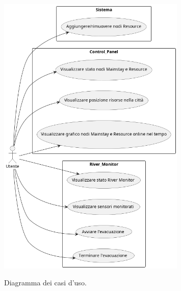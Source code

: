 \documentclass{scrartcl}
\begin{document}
\begin{figure}[H]
    \centering
    \caption{Diagramma dei casi d'uso.}
    \includegraphics[width=0.8\textwidth]{../assets/images/use-cases-diagram.png}
    \label{fig:use-cases-diagram}
\end{figure}
\end{document}
